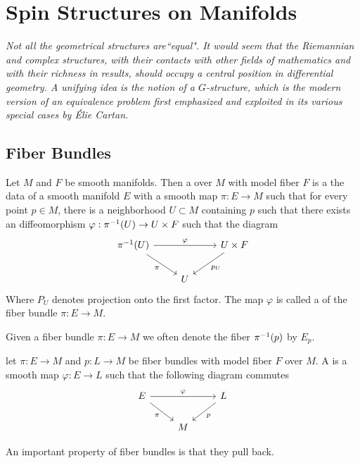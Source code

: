\chapter{Spin Structures on Manifolds}
%
\subsectionend $ $\\
%
\emph{Not all the geometrical structures are``equal". It would seem that the
Riemannian and complex structures, with their contacts with other fields of
mathematics and with their richness in results, should occupy a central position
in differential geometry. A unifying idea is the notion of a $G$-structure, which
is the modern version of an equivalence problem first emphasized and exploited
in its various special cases by \'Elie Cartan.} \\
%
%
\subsectionend
%
\section{Fiber Bundles}
%
\begin{defn}
Let $M$ and $F$ be smooth manifolds. Then a  over $M$ with
model fiber $F$ is a the data of a smooth manifold $E$ with a smooth map
$\pi : E \to M$ such that for every point $p \in M$, there is a neighborhood
$U \subset M$ containing $p$ such that there exists an diffeomorphism
$\varphi : \pi^{-1}(U) \to U \times F$ such that the diagram
\[\begin{tikzcd}
\pi\inv(U) \ar[rr, "\varphi"] \ar[dr, "\pi"']&& U \times F \ar[dl, "p_U"] \\
& U
\end{tikzcd}\]
Where $P_U$ denotes projection onto the first factor. The map $\varphi$ is
called a  of the fiber bundle $\pi : E \to M$.
\end{defn}
%
Given a fiber bundle $\pi : E \to M$ we often denote the fiber $\pi^{-1}(p)$
by $E_p$.
%
\begin{defn}
let $\pi : E \to M$ and $p : L \to M$ be fiber bundles with model fiber $F$
over $M$. A  is a smooth map $\varphi : E \to L$ such
that the following diagram commutes
\[\begin{tikzcd}
E \ar[dr, "\pi"']\ar[rr,"\varphi"] & & L \ar[dl, "p"] \\
& M
\end{tikzcd}\]
\end{defn}
%
An important property of fiber bundles is that they pull back.
